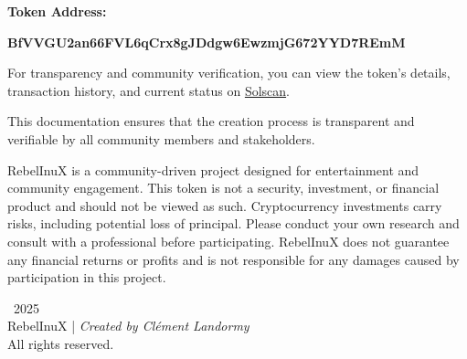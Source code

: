 \documentclass{article}
\begin{document}
\vspace{0.5em}
\noindent
\textbf{Token Address:}
\begin{center}
    \ttfamily \textbf{BfVVGU2an66FVL6qCrx8gJDdgw6EwzmjG672YYD7REmM}
\end{center}

\vspace{0.5em}
\noindent
For transparency and community verification, you can view the token's details, transaction history, and current status on \href{https://solscan.io/token/BfVVGU2an66FVL6qCrx8gJDdgw6EwzmjG672YYD7REmM}{Solscan}.

\bigskip
\noindent
This documentation ensures that the creation process is transparent and verifiable by all community members and stakeholders.

\begin{tcolorbox}[colback=backgroundColor!10!white, colframe=headerColor, boxrule=0.8mm, title=Legal Disclaimer, fonttitle=\bfseries]
RebelInuX is a community-driven project designed for entertainment and community engagement. This token is not a security, investment, or financial product and should not be viewed as such. Cryptocurrency investments carry risks, including potential loss of principal. Please conduct your own research and consult with a professional before participating. RebelInuX does not guarantee any financial returns or profits and is not responsible for any damages caused by participation in this project.
\end{tcolorbox}


\vspace{1em}

\begin{center}
\small \textcopyright\, 2025 \\
RebelInuX \quad | \quad \textit{Created by Clément Landormy} \\
All rights reserved.
\end{center}
\end{document}
